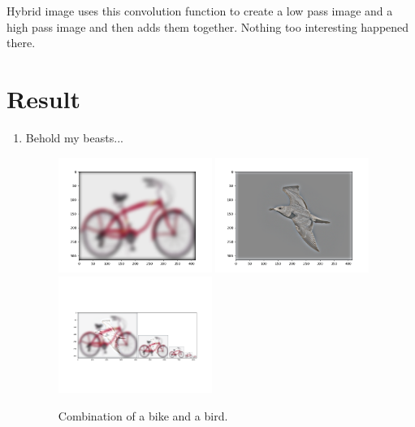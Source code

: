 Hybrid image uses this convolution function to create a low pass image and a high pass image and then adds them together. Nothing too interesting happened there.

\section*{Result}

\begin{enumerate}
    \item Behold my beasts...
    \begin{figure}[h]
        \centering
        \includegraphics[width=5cm]{lowpassBike.png}
        \includegraphics[width=5cm]{highpassBird.png}
        \includegraphics[width=5cm]{birdCycle.png}
        \caption{Combination of a bike and a bird.}
        \label{fig:result1}
    \end{figure}


\end{enumerate}
